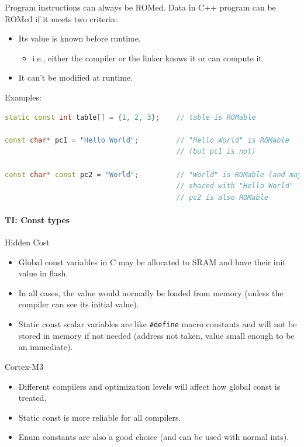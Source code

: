 Program instructions can always be ROMed.
Data in C++ program can be ROMed if it meets two criteria:
\begin{itemize}
  \item Its value is known before runtime.
  \begin{itemize}
    \item i.e., either the compiler or the linker knows it or can compute it.
  \end{itemize}
  \item It can't be modified at runtime.
\end{itemize}

Examples:
\begin{lstlisting}[language=C++]
static const int table[] = {1, 2, 3};    // table is ROMable

const char* pc1 = "Hello World";         // "Hello World" is ROMable
                                         // (but pc1 is not)

const char* const pc2 = "World";         // "World" is ROMable (and may be
                                         // shared with "Hello World"
                                         // pc2 is also ROMable
\end{lstlisting}

\paragraph{TI: Const types}
Hidden Cost
\begin{itemize}
  \item Global const variables in C may be allocated to SRAM and have their init value in flash.
  \item In all cases, the value would normally be loaded from memory (unless the compiler can see its initial value).
  \item Static const scalar variables are like \lstinline{#define} macro constants and will not be stored in memory if not needed (address not taken, value small enough to be an immediate).
\end{itemize}

Cortex-M3
\begin{itemize}
  \item Different compilers and optimization levels will affect how global const is treated.
  \item Static const is more reliable for all compilers.
  \item Enum constants are also a good choice (and can be used with normal ints).
\end{itemize}

